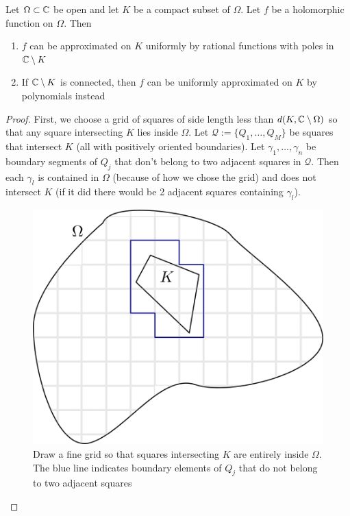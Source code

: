 \begin{theorem}
    Let $\Omega \subset \mathbb{C}$ be open and let $K$ be a compact subset of $\Omega$. Let $f$ be a holomorphic function on $\Omega$. Then
    \begin{enumerate}
        \item $f$ can be approximated on $K$ uniformly by rational functions with poles in $\mathbb{C} \setminus K$
        \item If $\mathbb{C} \setminus K$ is connected, then $f$ can be uniformly approximated on $K$ by polynomials instead
    \end{enumerate}
\end{theorem}
\begin{proof}
    First, we choose a grid of squares of side length less than $d(K, \mathbb{C} \setminus \Omega)$ so that any square intersecting $K$ lies inside $\Omega$. Let $\mathcal{Q} := \{Q_1, \dots, Q_M\}$ be squares that intersect $K$ (all with positively oriented boundaries). Let $\gamma_1, \dots, \gamma_n$ be boundary segments of $Q_j$ that don't belong to two adjacent squares in $\mathcal{Q}$. Then each $\gamma_l$ is contained in $\Omega$ (because of how we chose the grid) and does not intersect $K$ (if it did there would be 2 adjacent squares containing $\gamma_l$).

    \begin{figure}[h]
        \centering
        \includegraphics[scale=0.9]{Images/runge_approx_grid.png}
        \caption{Draw a fine grid so that squares intersecting $K$ are entirely inside $\Omega$. The blue line indicates boundary elements of $Q_j$ that do not belong to two adjacent squares}
        \label{fig:runge-approx-grid}
    \end{figure}


\end{proof}
